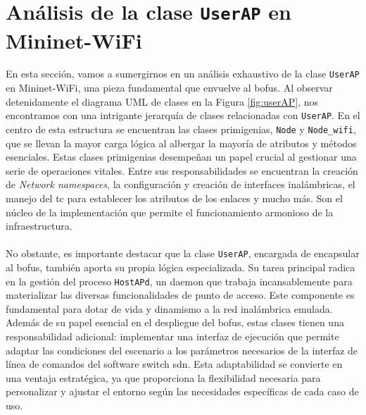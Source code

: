 \section{Análisis de la clase \texttt{UserAP} en Mininet-WiFi}
\label{sec:ana_userap}

En esta sección, vamos a sumergirnos en un análisis exhaustivo de la clase \texttt{UserAP} en Mininet-WiFi, una pieza fundamental que envuelve al \gls{bofus}. Al observar detenidamente el diagrama UML de clases en la Figura \ref{fig:userAP}, nos encontramos con una intrigante jerarquía de clases relacionadas con \texttt{UserAP}. En el centro de esta estructura se encuentran las clases primigenias, \texttt{Node} y \texttt{Node\_wifi}, que se llevan la mayor carga lógica al albergar la mayoría de atributos y métodos esenciales. Estas clases primigenias desempeñan un papel crucial al gestionar una serie de operaciones vitales. Entre sus responsabilidades se encuentran la creación de \textit{Network namespaces}, la configuración y creación de interfaces inalámbricas, el manejo del \gls{tc} para establecer los atributos de los enlaces y mucho más. Son el núcleo de la implementación que permite el funcionamiento armonioso de la infraestructura.\\
\\
No obstante, es importante destacar que la clase \texttt{UserAP}, encargada de encapsular al \gls{bofus}, también aporta su propia lógica especializada. Su tarea principal radica en la gestión del proceso \texttt{HostAPd}, un daemon que trabaja incansablemente para materializar las diversas funcionalidades de punto de acceso. Este componente es fundamental para dotar de vida y dinamismo a la red inalámbrica emulada. Además de su papel esencial en el despliegue del \gls{bofus}, estas clases tienen una responsabilidad adicional: implementar una interfaz de ejecución que permite adaptar las condiciones del escenario a los parámetros necesarios de la interfaz de línea de comandos del software switch \gls{sdn}. Esta adaptabilidad se convierte en una ventaja estratégica, ya que proporciona la flexibilidad necesaria para personalizar y ajustar el entorno según las necesidades específicas de cada caso de uso.
